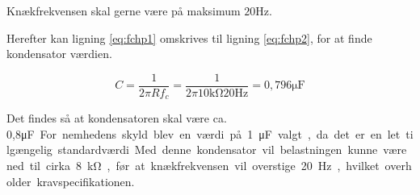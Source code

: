 Knækfrekvensen skal gerne være på maksimum $20\si{\hertz}$.

Herefter kan ligning \ref{eq:fchp1} omskrives til ligning \ref{eq:fchp2}, for at finde kondensator værdien.

\begin{equation}
	C = \frac{1}{2\pi Rf_c} = \frac{1}{2\pi 10\si{\kilo\ohm} 20\si{\hertz}} = 0,796\si{\micro\farad}
\label{eq:fchp2}
\end{equation}

Det findes så at kondensatoren skal være ca. 0,8\si\micro\farad.
For nemhedens skyld blev en værdi på 1\si\micro\farad valgt, da det er en let tilgængelig standardværdi.
Med denne kondensator vil belastningen kunne være ned til cirka 8\si\kilo\ohm, før at knækfrekvensen vil overstige 20\si\hertz, hvilket overholder kravspecifikationen.




